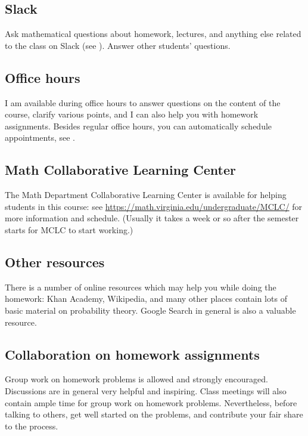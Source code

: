 \documentclass[oneside,11pt]{amsart}
\begin{document}
\subsection{Slack}

Ask mathematical questions about homework, lectures, and anything else
related to the class on Slack 
(see ).
Answer other students' questions.

\subsection{Office hours}

I am available during office hours to answer questions on the content of the 
course, clarify various points, and I can also help you with homework assignments. 
Besides regular office hours, you can automatically schedule appointments, see 
.

\subsection{Math Collaborative Learning Center}

The Math Department 
Collaborative Learning Center
is available for helping students in this course: 
see \url{https://math.virginia.edu/undergraduate/MCLC/}
for more information and schedule. 
(Usually it takes a week or so after the semester starts for MCLC to start working.)

\subsection{Other resources}

There is a number of online resources which may help you while doing the homework:
Khan Academy, Wikipedia, and many other 
places contain lots of basic material on probability theory. Google Search
in general
is also a valuable resource.

\subsection{Collaboration on homework assignments}
\label{collaboration}

Group work on homework problems is allowed and strongly encouraged.
Discussions are in general very
helpful and inspiring. Class meetings will also contain ample time
for group work on homework problems.
Nevertheless, before talking to others, get well started
on the problems, and contribute your fair share to the process. 
\end{document}
